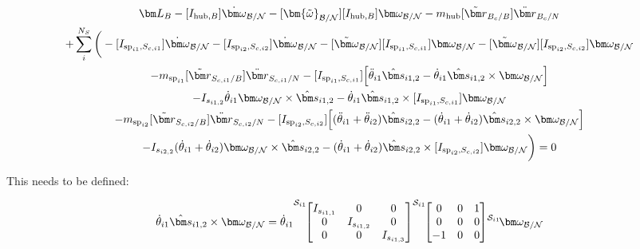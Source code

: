 \begin{multline}
	\bm L_B -[I_{\text{hub},B}] \dot{\bm\omega}_{\cal B/N}  -[\bm{\tilde{\omega}}_{\cal B/N}] [I_{\text{hub},B}] \bm\omega_{\cal B/N} - m_{\text{hub}} [\tilde{{\bm r}}_{B_c/B}] \ddot{\bm r}_{B_c/N} \\
	+ \sum\limits_{i}^{N_S}\bigg(-[I_{\text{sp}_{i1},S_{c,i1}}] \dot{\bm \omega}_{\cal{B/N}} -[I_{\text{sp}_{i2},S_{c,i2}}] \dot{\bm \omega}_{\cal{B/N}} -[\tilde{\bm \omega}_{\cal{B/N}}] [I_{\text{sp}_{i1},S_{c,i1}}] \bm \omega_{\cal{B/N}}-[\tilde{\bm \omega}_{\cal{B/N}}] [I_{\text{sp}_{i2},S_{c,i2}}] \bm \omega_{\cal{B/N}}\\
	- m_{\text{sp}_{i1}} [\tilde{{\bm r}}_{S_{c,i1}/B}] \ddot{\bm r}_{S_{c,i1}/N} -[I_{\text{sp}_{i1},S_{c,i1}}] \Big[ \ddot{\theta}_{i1} \hat{\bm s}_{i1,2} - \dot{\theta}_{i1} \hat{\bm s}_{i1,2} \times \bm \omega_{\cal{B/N}} \Big]  \\
	-I_{s_{i1,2}} \dot{\theta}_{i1} \bm \omega_{\cal{B/N}} \times \hat{\bm s}_{i1,2} -\dot{\theta}_{i1} \hat{\bm s}_{i1,2} \times [I_{\text{sp}_{i1},S_{c,i1}}]\bm \omega_{\cal{B/N}}\\
	- m_{\text{sp}_{i2}} [\tilde{{\bm r}}_{S_{c,i2}/B}] \ddot{\bm r}_{S_{c,i2}/N} -[I_{\text{sp}_{i2},S_{c,i2}}] \Big[ (\ddot{\theta}_{i1}  + \ddot{\theta}_{i2})\hat{\bm s}_{i2,2} - (\dot{\theta}_{i1}  + \dot{\theta}_{i2})  \hat{\bm s}_{i2,2} \times \bm \omega_{\cal{B/N}}\Big]  \\
	-I_{s_{i2,2}}  (\dot{\theta}_{i1}  + \dot{\theta}_{i2}) \bm \omega_{\cal{B/N}} \times \hat{\bm s}_{i2,2} -(\dot{\theta}_{i1}  + \dot{\theta}_{i2})\hat{\bm s}_{i2,2} \times [I_{\text{sp}_{i2},S_{c,i2}}] \bm \omega_{\cal{B/N}}\bigg) = 0
\end{multline}

This needs to be defined:

\begin{equation}
	[I_{\text{sp}_{i1},S_{c,i1}}] \dot{\theta}_{i1} \hat{\bm s}_{i1,2} \times \bm \omega_{\cal{B/N}} = \dot{\theta}_{i1} {\vphantom{\begin{bmatrix}
				I_{s_{i1,1}} & 0 & 0 \\
				0 & I_{s_{i1,2}} & 0 \\
				0 & 0 & I_{s_{i1,3}}
	\end{bmatrix}}}^{\mathcal{S}_{i1}\!}{\begin{bmatrix}
			I_{s_{i1,1}} & 0 & 0 \\
			0 & I_{s_{i1,2}} & 0 \\
			0 & 0 & I_{s_{i1,3}}
	\end{bmatrix}} {\vphantom{\begin{bmatrix}
				0 & 0 & 1 \\
				0 & 0 & 0 \\
				-1 & 0 & 0
	\end{bmatrix}}}^{\mathcal{S}_{i1}\!}{\begin{bmatrix}
			0 & 0 & 1 \\
			0 & 0 & 0 \\
			-1 & 0 & 0
	\end{bmatrix}} {\vphantom{\bm \omega_{\cal{B/N}}}}^{\mathcal{S}_{i1}\!}{\bm \omega_{\cal{B/N}}}
\end{equation}

